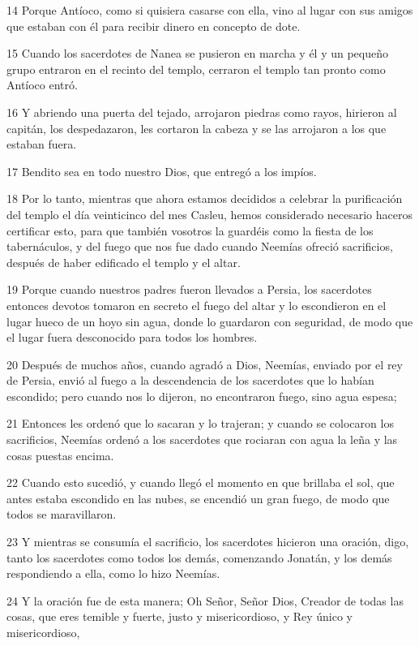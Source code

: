 \par 14 Porque Antíoco, como si quisiera casarse con ella, vino al lugar con sus amigos que estaban con él para recibir dinero en concepto de dote.
\par 15 Cuando los sacerdotes de Nanea se pusieron en marcha y él y un pequeño grupo entraron en el recinto del templo, cerraron el templo tan pronto como Antíoco entró.
\par 16 Y abriendo una puerta del tejado, arrojaron piedras como rayos, hirieron al capitán, los despedazaron, les cortaron la cabeza y se las arrojaron a los que estaban fuera.
\par 17 Bendito sea en todo nuestro Dios, que entregó a los impíos.
\par 18 Por lo tanto, mientras que ahora estamos decididos a celebrar la purificación del templo el día veinticinco del mes Casleu, hemos considerado necesario haceros certificar esto, para que también vosotros la guardéis como la fiesta de los tabernáculos, y del fuego que nos fue dado cuando Neemías ofreció sacrificios, después de haber edificado el templo y el altar.
\par 19 Porque cuando nuestros padres fueron llevados a Persia, los sacerdotes entonces devotos tomaron en secreto el fuego del altar y lo escondieron en el lugar hueco de un hoyo sin agua, donde lo guardaron con seguridad, de modo que el lugar fuera desconocido para todos los hombres.
\par 20 Después de muchos años, cuando agradó a Dios, Neemías, enviado por el rey de Persia, envió al fuego a la descendencia de los sacerdotes que lo habían escondido; pero cuando nos lo dijeron, no encontraron fuego, sino agua espesa;
\par 21 Entonces les ordenó que lo sacaran y lo trajeran; y cuando se colocaron los sacrificios, Neemías ordenó a los sacerdotes que rociaran con agua la leña y las cosas puestas encima.
\par 22 Cuando esto sucedió, y cuando llegó el momento en que brillaba el sol, que antes estaba escondido en las nubes, se encendió un gran fuego, de modo que todos se maravillaron.
\par 23 Y mientras se consumía el sacrificio, los sacerdotes hicieron una oración, digo, tanto los sacerdotes como todos los demás, comenzando Jonatán, y los demás respondiendo a ella, como lo hizo Neemías.
\par 24 Y la oración fue de esta manera; Oh Señor, Señor Dios, Creador de todas las cosas, que eres temible y fuerte, justo y misericordioso, y Rey único y misericordioso,
